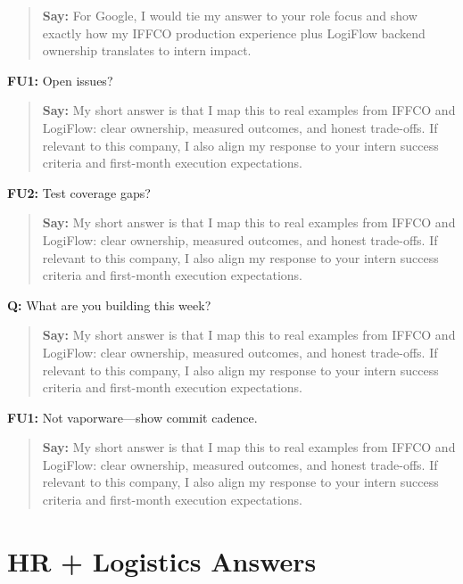 \documentclass[9pt,a4paper]{article}
\begin{document}
\begin{quote}\small\textbf{Say:} For Google, I would tie my answer to your role focus and show exactly how my IFFCO production experience plus LogiFlow backend ownership translates to intern impact.\end{quote}
\vspace{2mm}
\textbf{FU1:} Open issues?

\begin{quote}\small\textbf{Say:} My short answer is that I map this to real examples from IFFCO and LogiFlow: clear ownership, measured outcomes, and honest trade-offs. If relevant to this company, I also align my response to your intern success criteria and first-month execution expectations.\end{quote}
\vspace{2mm}
\textbf{FU2:} Test coverage gaps?

\begin{quote}\small\textbf{Say:} My short answer is that I map this to real examples from IFFCO and LogiFlow: clear ownership, measured outcomes, and honest trade-offs. If relevant to this company, I also align my response to your intern success criteria and first-month execution expectations.\end{quote}
\vspace{2mm}
\textbf{Q:} What are you building this week?

\begin{quote}\small\textbf{Say:} My short answer is that I map this to real examples from IFFCO and LogiFlow: clear ownership, measured outcomes, and honest trade-offs. If relevant to this company, I also align my response to your intern success criteria and first-month execution expectations.\end{quote}
\vspace{2mm}
\textbf{FU1:} Not vaporware---show commit cadence.

\begin{quote}\small\textbf{Say:} My short answer is that I map this to real examples from IFFCO and LogiFlow: clear ownership, measured outcomes, and honest trade-offs. If relevant to this company, I also align my response to your intern success criteria and first-month execution expectations.\end{quote}
\vspace{2mm}
\section{HR + Logistics Answers}
\end{document}
